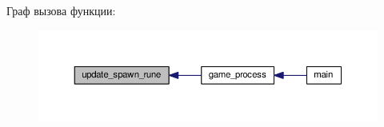 Граф вызова функции\+:\nopagebreak
\begin{figure}[H]
\begin{center}
\leavevmode
\includegraphics[width=350pt]{group__runeHandler_ga813bbb2330c07f4bf303406c4efab35d_icgraph}
\end{center}
\end{figure}


